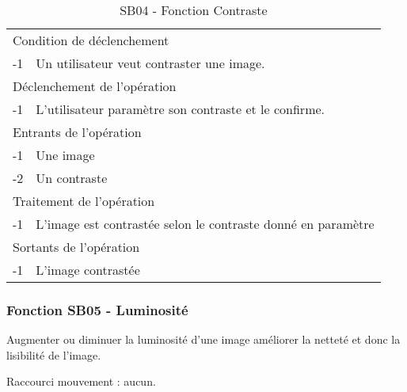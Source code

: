 \documentclass[a4paper]{article}
\begin{document}
\begin{table}[H]
  \centering
   \small
	\begin{tabular}{|c|p{12cm}|}
   		\hline
   			\rowcolor{lightgray}\multicolumn{2}{|c|}{\textbf{SB04 - Fonction Contraste}} \\
   		\hline
   			\multicolumn{2}{|l|}{Condition de d\'eclenchement} \\
   		\hline
   			-1 & Un utilisateur veut contraster une image. \\
   		\hline
   			\multicolumn{2}{|l|}{D\'eclenchement de l'op\'eration} \\
   		\hline
   			-1 & L'utilisateur paramètre son contraste et le confirme. \\
   		\hline
   			\multicolumn{2}{|l|}{Entrants de l'op\'eration} \\
   		\hline
        	-1 & Une image \\
   			-2 & Un contraste \\ 	
        \hline
   			\multicolumn{2}{|l|}{Traitement de l'op\'eration} \\
  		\hline
   			-1 & L'image est contrastée selon le contraste donné en paramètre \\
   		\hline
   			\multicolumn{2}{|l|}{Sortants de l'op\'eration} \\
   		\hline
   			-1 & L'image contrastée \\
   		\hline
	\end{tabular}
  \caption{SB04 - Fonction Contraste}
  \normalsize
  \label{tab:visu_img_contraste}
\end{table}



\subsubsection{Fonction SB05 - Luminosité}


Augmenter ou diminuer la luminosité d'une image améliorer la netteté et donc la lisibilité de l'image.

Raccourci mouvement : aucun.
\end{document}
